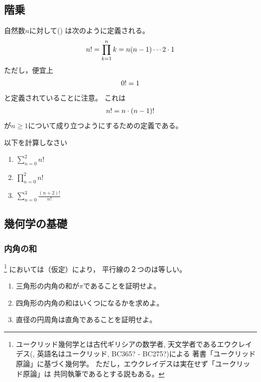 \documentclass[twocolumn,11pt]{jarticle}
\begin{document}
\subsection{階乗}
自然数$n$に対して()
は次のように定義される。
\begin{align}
  n!=\prod_{k=1}^nk=n(n-1)\cdots2\cdot 1\notag
\end{align}
ただし，便宜上
\begin{align}
  0!=1\notag  
\end{align}
と定義されていることに注意。
これは
\begin{align}
n!=n\cdot(n-1)!\notag
\end{align}
が$n\ge 1$について成り立つようにするための定義である。

\nquestion
以下を計算しなさい
\begin{enumerate}
\item\label{item:sum_n=(0-2)n!} $\displaystyle\sum_{n=0}^2n!$
\item\label{item:prod_n=(0-2)n!} $\displaystyle\prod_{n=0}^2n!$
\item\label{item:sum_n=(0-3)(n+2)!/n!} $\displaystyle\sum_{n=0}^3\frac{(n+2)!}{n!}$
\end{enumerate}

\subsection{幾何学の基礎}

\subsubsection{内角の和}

\footnote{ユークリッド幾何学とは古代ギリシアの数学者, 
天文学者であるエウクレイデス(, 
英語名はユークリッド, BC365? - BC275?)による
著書「ユークリッド原論」に基づく幾何学。
ただし，エウクレイデスは実在せず「ユークリッド原論」は
共同執筆であるとする説もある。
}
においては（仮定）により，
平行線の２つのは等しい。
\begin{enumerate}
\item 三角形の内角の和が$\pi$であることを証明せよ。
\item 四角形の内角の和はいくつになるかを求めよ。
\item 直径の円周角は直角であることを証明せよ。
\end{enumerate}
\end{document}

